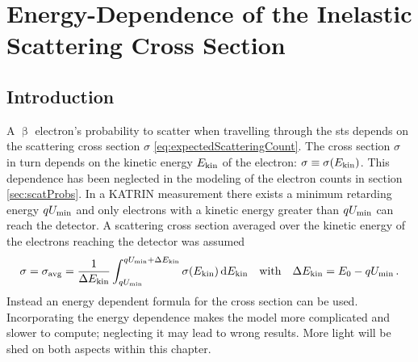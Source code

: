 

\chapter{Energy-Dependence of the Inelastic Scattering Cross Section}
\section{Introduction}
A $\upbeta$ electron's probability to scatter when travelling through the \gls{sts} depends on the scattering cross section $\sigma$ \eqref{eq:expectedScatteringCount}. The cross section $\sigma$ in turn depends on the kinetic energy $E_\mathrm{kin}$ of the electron: $\sigma \equiv \sigma(E_\mathrm{kin})$. This dependence has been neglected in the modeling of the electron counts in section \ref{sec:scatProbs}. In a KATRIN measurement there exists a minimum retarding energy $qU_\mathrm{min}$ and only electrons with a kinetic energy greater than $qU_\mathrm{min}$ can reach the detector. A scattering cross section averaged over the kinetic energy of the electrons reaching the detector was assumed
\begin{equation}
    \sigma = \sigma_\mathrm{avg} = 
    \frac{1}{\Delta E_\mathrm{kin}} 
    \int_{qU_\mathrm{min}}^{qU_\mathrm{min}+\Delta E_\mathrm{kin}} \sigma(E_\mathrm{kin}) \mathop{}\!\mathrm{d} E_\mathrm{kin} 
    \quad \text{with} \quad
    \Delta E_\mathrm{kin} = E_0-qU_\mathrm{min}
    \text{\,.}
\end{equation}
Instead an energy dependent formula for the cross section can be used. Incorporating the energy dependence makes the model more complicated and slower to compute; neglecting it may lead to wrong results. More light will be shed on both aspects within this chapter.

